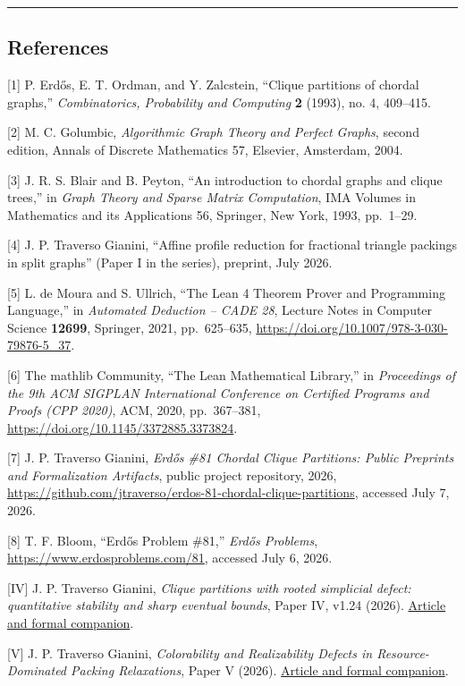 \documentclass[english,11pt,a4paper]{article}
\begin{document}
\begin{center}\rule{0.5\linewidth}{0.5pt}\end{center}

\subsection{References}\label{references}

{[}1{]} P. Erdős, E. T. Ordman, and Y. Zalcstein, ``Clique partitions of
chordal graphs,'' \emph{Combinatorics, Probability and Computing}
\textbf{2} (1993), no. 4, 409--415.

{[}2{]} M. C. Golumbic, \emph{Algorithmic Graph Theory and Perfect
Graphs}, second edition, Annals of Discrete Mathematics 57, Elsevier,
Amsterdam, 2004.

{[}3{]} J. R. S. Blair and B. Peyton, ``An introduction to chordal
graphs and clique trees,'' in \emph{Graph Theory and Sparse Matrix
Computation}, IMA Volumes in Mathematics and its Applications 56,
Springer, New York, 1993, pp.~1--29.

{[}4{]} J. P. Traverso Gianini, ``Affine profile reduction for
fractional triangle packings in split graphs'' (Paper I in the series),
preprint, July 2026.

{[}5{]} L. de Moura and S. Ullrich, ``The Lean 4 Theorem Prover and
Programming Language,'' in \emph{Automated Deduction -- CADE 28},
Lecture Notes in Computer Science \textbf{12699}, Springer, 2021,
pp.~625--635, \url{https://doi.org/10.1007/978-3-030-79876-5_37}.

{[}6{]} The mathlib Community, ``The Lean Mathematical Library,'' in
\emph{Proceedings of the 9th ACM SIGPLAN International Conference on
Certified Programs and Proofs (CPP 2020)}, ACM, 2020, pp.~367--381,
\url{https://doi.org/10.1145/3372885.3373824}.

{[}7{]} J. P. Traverso Gianini, \emph{Erdős \#81 Chordal Clique
Partitions: Public Preprints and Formalization Artifacts}, public
project repository, 2026,
\url{https://github.com/jtraverso/erdos-81-chordal-clique-partitions},
accessed July 7, 2026.

{[}8{]} T. F. Bloom, ``Erdős Problem \#81,'' \emph{Erdős Problems},
\url{https://www.erdosproblems.com/81}, accessed July 6, 2026.

{[}IV{]} J. P. Traverso Gianini, \emph{Clique partitions with rooted
simplicial defect: quantitative stability and sharp eventual bounds},
Paper IV, v1.24 (2026).
\href{https://github.com/jtraverso/erdos-81-chordal-clique-partitions/tree/eb335845bfa23375d5040ea31fc4f4b366346287/preprints/PAPER_IV}{Article
and formal companion}.

{[}V{]} J. P. Traverso Gianini, \emph{Colorability and Realizability
Defects in Resource-Dominated Packing Relaxations}, Paper V (2026).
\href{https://github.com/jtraverso/erdos-81-chordal-clique-partitions/tree/eb335845bfa23375d5040ea31fc4f4b366346287/preprints/PAPER_V}{Article
and formal companion}.
\end{document}
